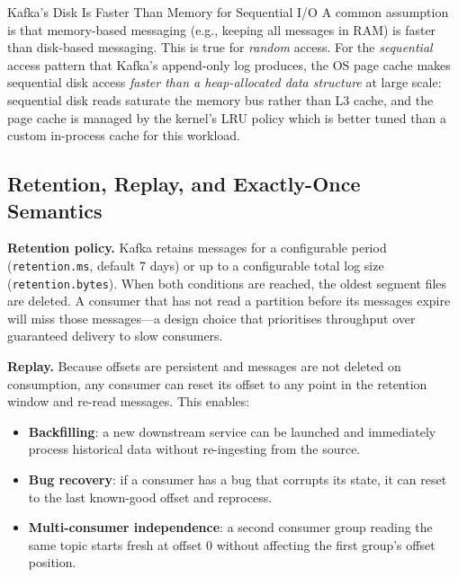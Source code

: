 \begin{keyinsight}{Kafka's Disk Is Faster Than Memory for Sequential I/O}
A common assumption is that memory-based messaging (e.g., keeping all
messages in RAM) is faster than disk-based messaging. This is true
for \emph{random} access. For the \emph{sequential} access pattern
that Kafka's append-only log produces, the OS page cache makes
sequential disk access \emph{faster than a heap-allocated data structure}
at large scale: sequential disk reads saturate the memory bus rather
than L3 cache, and the page cache is managed by the kernel's LRU policy
which is better tuned than a custom in-process cache for this workload.
\end{keyinsight}

\subsection{Retention, Replay, and Exactly-Once Semantics}
\label{subsec:kafka-retention}

\textbf{Retention policy.} Kafka retains messages for a configurable
period (\texttt{retention.ms}, default 7 days) or up to a configurable
total log size (\texttt{retention.bytes}). When both conditions are
reached, the oldest segment files are deleted. A consumer that has not
read a partition before its messages expire will miss those messages---a
design choice that prioritises throughput over guaranteed delivery to
slow consumers.

\textbf{Replay.} Because offsets are persistent and messages are not
deleted on consumption, any consumer can reset its offset to any point
in the retention window and re-read messages. This enables:
\begin{itemize}
  \item \textbf{Backfilling}: a new downstream service can be launched
        and immediately process historical data without re-ingesting
        from the source.
  \item \textbf{Bug recovery}: if a consumer has a bug that corrupts its
        state, it can reset to the last known-good offset and reprocess.
  \item \textbf{Multi-consumer independence}: a second consumer group
        reading the same topic starts fresh at offset 0 without affecting
        the first group's offset position.
\end{itemize}

